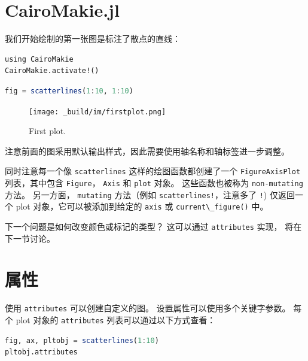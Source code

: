 \documentclass[
  notoc %
]{tufte-book}
\newcommand{\passthrough}[1]{#1}
\begin{document}
\hypertarget{sec:cairomakie}{%
\section{CairoMakie.jl}\label{sec:cairomakie}}

我们开始绘制的第一张图是标注了散点的直线：

\begin{lstlisting}
using CairoMakie
CairoMakie.activate!()
\end{lstlisting}

\begin{lstlisting}[language=Julia]
fig = scatterlines(1:10, 1:10)
\end{lstlisting}

\begin{figure}
\hypertarget{fig:firstplot}{%
\centering
\texttt{[image: \_build/im/firstplot.png]}
\caption{First plot.}\label{fig:firstplot}
}
\end{figure}

注意前面的图采用默认输出样式，因此需要使用轴名称和轴标签进一步调整。

同时注意每一个像 \passthrough{\lstinline!scatterlines!}
这样的绘图函数都创建了一个 \passthrough{\lstinline!FigureAxisPlot!}
列表，其中包含 \passthrough{\lstinline!Figure!}，
\passthrough{\lstinline!Axis!} 和 \passthrough{\lstinline!plot!} 对象。
这些函数也被称为 \passthrough{\lstinline!non-mutating!} 方法。
另一方面， \passthrough{\lstinline!mutating!} 方法（例如
\passthrough{\lstinline"scatterlines!"}，注意多了
\passthrough{\lstinline"!"}) 仅返回一个 plot 对象，它可以被添加到给定的
\passthrough{\lstinline!axis!} 或
\passthrough{\lstinline!current\_figure()!} 中。

下一个问题是如何改变颜色或标记的类型？ 这可以通过
\passthrough{\lstinline!attributes!} 实现， 将在下一节讨论。

\hypertarget{sec:datavisMakie_attributes}{%
\section{属性}\label{sec:datavisMakie_attributes}}

使用 \passthrough{\lstinline!attributes!} 可以创建自定义的图。
设置属性可以使用多个关键字参数。 每个 plot 对象的
\passthrough{\lstinline!attributes!} 列表可以通过以下方式查看：

\begin{lstlisting}[language=Julia]
fig, ax, pltobj = scatterlines(1:10)
pltobj.attributes
\end{lstlisting}
\end{document}
